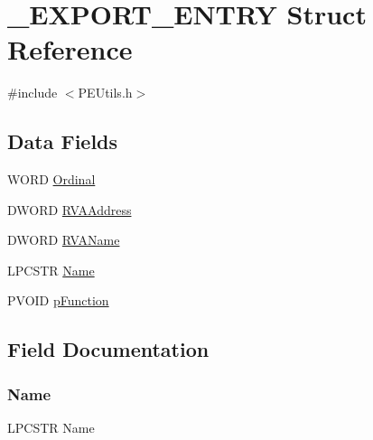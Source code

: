 \hypertarget{struct___e_x_p_o_r_t___e_n_t_r_y}{}\section{\+\_\+\+E\+X\+P\+O\+R\+T\+\_\+\+E\+N\+T\+RY Struct Reference}
\label{struct___e_x_p_o_r_t___e_n_t_r_y}


{\ttfamily \#include $<$P\+E\+Utils.\+h$>$}

\subsection*{Data Fields}
\begin{DoxyCompactItemize}
\item 
W\+O\+RD \mbox{\hyperlink{struct___e_x_p_o_r_t___e_n_t_r_y_a652f0cc7ecebf15c7b80d6d9279b0d61}{Ordinal}}
\item 
D\+W\+O\+RD \mbox{\hyperlink{struct___e_x_p_o_r_t___e_n_t_r_y_ae6923042664abffba84bc32212d5536e}{R\+V\+A\+Address}}
\item 
D\+W\+O\+RD \mbox{\hyperlink{struct___e_x_p_o_r_t___e_n_t_r_y_a2973c212d80b7a5daeeac53fb1be2833}{R\+V\+A\+Name}}
\item 
L\+P\+C\+S\+TR \mbox{\hyperlink{struct___e_x_p_o_r_t___e_n_t_r_y_a51f882ebd42a4662b95800c6834a92e8}{Name}}
\item 
P\+V\+O\+ID \mbox{\hyperlink{struct___e_x_p_o_r_t___e_n_t_r_y_a5449d39a9671dc6e16c51870e249776c}{p\+Function}}
\end{DoxyCompactItemize}


\subsection{Field Documentation}
\mbox{\label{struct___e_x_p_o_r_t___e_n_t_r_y_a51f882ebd42a4662b95800c6834a92e8}} 
\subsubsection{\texorpdfstring{Name}{Name}}
{\footnotesize\ttfamily L\+P\+C\+S\+TR Name}

\mbox{\label{struct___e_x_p_o_r_t___e_n_t_r_y_a652f0cc7ecebf15c7b80d6d9279b0d61}} 
